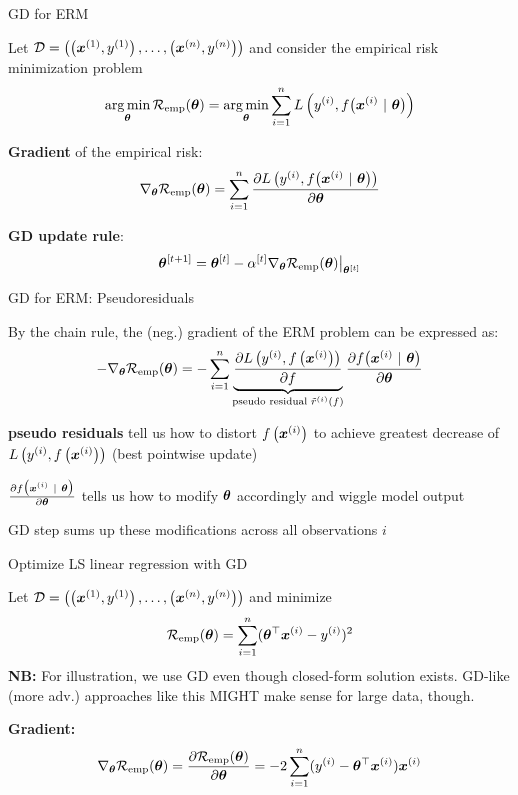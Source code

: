 \documentclass[11pt,compress,t,notes=noshow, xcolor=table]{beamer}
\begin{document}
\begin{framei}{GD for ERM}
\item Let $\D = \Dset$ and consider the empirical risk minimization problem
$$\argmin_{\thetav} \risket = \argmin_{\thetav} \sumin \Lxyit$$
\item \textbf{Gradient} of the empirical risk:
$$\nabla_{\thetav} \risket = \sumin \pd{\Lxyit}{\thetav}$$
\item \textbf{GD update rule}:
$$\thetav^{[t+1]} = \thetav^{[t]} - \alpha^{[t]} \nabla_{\thetav} \risket\big|_{\thetav^{[t]}}$$
\end{framei}


\begin{framei}[fs=footnotesize]{GD for ERM: Pseudoresiduals}
\item By the chain rule, the (neg.) gradient of the ERM problem can be expressed as:
$$
- \nabla_{\thetav} \risket = - \sumin \underbrace{\pd{\Lxyi}{f}}_{\text{pseudo residual } \tilde r^{(i)}(f)} \pd{\fxit}{\thetav}
$$
\item \textbf{pseudo residuals} tell us how to distort $\fxi$ to achieve greatest decrease of $\Lxyi$ (best pointwise update)
\item $\pd{\fxit}{\thetav}$ tells us how to modify $\thetav$ accordingly and wiggle model output
\item GD step sums up these modifications across all observations $i$
{}
\end{framei}


\begin{framei}{Optimize LS linear regression with GD}
\item Let $\D = \Dset$ and minimize
$$\risket = \sumin (\thetav^\top \xi - \yi)^2$$
{\footnotesize
\textbf{NB:} For illustration, we use GD even though closed-form solution exists. GD-like (more adv.) approaches like this MIGHT make sense for large data, though.}
\item\textbf{Gradient: } $$\nabla_{\thetav}\risket = \frac{\partial \risket}{\partial \thetav} = -2 \sumin (\yi - \thetav^{\top} \xv^{(i)}) \xv^{(i)}$$
\end{framei}
\end{document}
